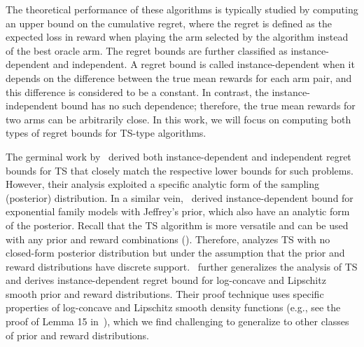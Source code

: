 \documentclass[11pt]{article}
\begin{document}
The theoretical performance of these algorithms is typically studied by computing an upper bound on the cumulative regret, where the regret is defined as the expected loss in reward when playing the arm selected by the algorithm instead of the best oracle arm. The regret bounds are further classified as instance-dependent and independent. A regret bound is called instance-dependent when it depends on the difference between the true mean rewards for each arm pair, and this difference is considered to be a constant. In contrast, the instance-independent bound has no such dependence; therefore, the true mean rewards for two arms can be arbitrarily close. 
In this work, we will focus on computing both types of regret bounds for TS-type algorithms. 

The germinal work by~\cite{agarwal2017effective} derived both  instance-dependent and independent regret bounds for TS that closely match the respective lower bounds for such problems. However, their analysis exploited a specific analytic form of the sampling (posterior) distribution. In a similar vein,~\cite{Kaufmann2013} derived instance-dependent bound for exponential family models with Jeffrey's prior, which also have an analytic form of the posterior. Recall that the TS algorithm is more versatile and can be used with any prior and reward combinations (\cite{li2012open,chapelle2011empirical,urteaga2018nonparametric,hong22b}). Therefore, \cite{gopalan2013thompson} analyzes TS with no closed-form posterior distribution but under the assumption that the prior and reward distributions have discrete support.~\cite{mazumdar20a} further generalizes the analysis of TS and derives instance-dependent regret bound for log-concave and Lipschitz smooth prior and reward distributions. Their proof technique uses specific properties of log-concave and Lipschitz smooth density functions (e.g., see the proof of Lemma 15 in~\cite{mazumdar20a}), which we find challenging to generalize to other classes of prior and reward distributions.
\end{document}

